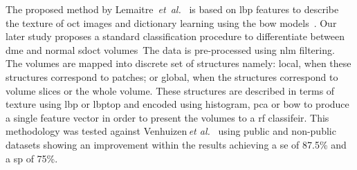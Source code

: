 The proposed method by Lemaitre~\emph{et~al.}~\cite{Lemaintre2015miccaiOCT} is based on \gls{lbp} features to describe the texture of \gls{oct} images and dictionary learning using the \gls{bow} models~\cite{Sivic2003}.
Our later study proposes a standard classification procedure to differentiate between \gls{dme} and normal \gls{sdoct} volumes~\cite{Lemaitre2015}The data is pre-processed using \gls{nlm} filtering.
The volumes are mapped into discrete set of structures namely: local, when these structures correspond to patches; or global, when the structures correspond to volume slices or the whole volume.
These structures are described in terms of texture using \gls{lbp} or \gls{lbptop} and encoded using histogram, \gls{pca} or \gls{bow} to produce a single feature vector in order to present the volumes to a \gls{rf} classifeir.
This methodology was tested against Venhuizen\,\textit{et al.}~\cite{Venhuizen2015} using public and non-public datasets showing an improvement within the results achieving a \gls{se} of 87.5\% and a \gls{sp} of 75\%.



% 
